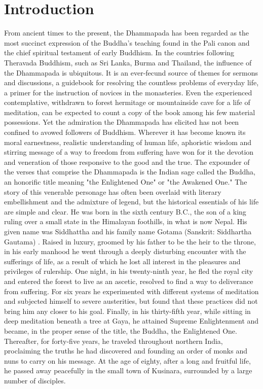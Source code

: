 \newpage
\chapter{Introduction}
	From ancient times to the present, the Dhammapada has been regarded as the most succinct expression of the Buddha's teaching found in the Pali canon and the chief spiritual testament of early Buddhism. In the countries following Theravada Buddhism, such as Sri Lanka, Burma and Thailand, the influence of the Dhammapada is ubiquitous. It is an ever-fecund source of themes for sermons and discussions, a guidebook for resolving the countless problems of everyday life, a primer for the instruction of novices in the monasteries. Even the experienced contemplative, withdrawn to forest hermitage or mountainside cave for a life of meditation, can be expected to count a copy of the book among his few material possessions. Yet the admiration the Dhammapada has elicited has not been confined to avowed followers of Buddhism. Wherever it has become known its moral earnestness, realistic understanding of human life, aphoristic wisdom and stirring message of a way to freedom from suffering have won for it the devotion and veneration of those responsive to the good and the true.
	The expounder of the verses that comprise the Dhammapada is the Indian sage called the Buddha, an honorific title meaning "the Enlightened One" or "the Awakened One." The story of this venerable personage has often been overlaid with literary embellishment and the admixture of legend, but the historical essentials of his life are simple and clear. He was born in the sixth century B.C., the son of a king ruling over a small state in the Himalayan foothills, in what is now Nepal. His given name was Siddhattha and his family name Gotama (Sanskrit: Siddhartha Gautama) . Raised in luxury, groomed by his father to be the heir to the throne, in his early manhood he went through a deeply disturbing encounter with the sufferings of life, as a result of which he lost all interest in the pleasures and privileges of rulership. One night, in his twenty-ninth year, he fled the royal city and entered the forest to live as an ascetic, resolved to find a way to deliverance from suffering. For six years he experimented with different systems of meditation and subjected himself to severe austerities, but found that these practices did not bring him any closer to his goal. Finally, in his thirty-fifth year, while sitting in deep meditation beneath a tree at Gaya, he attained Supreme Enlightenment and became, in the proper sense of the title, the Buddha, the Enlightened One. Thereafter, for forty-five years, he traveled throughout northern India, proclaiming the truths he had discovered and founding an order of monks and nuns to carry on his message. At the age of eighty, after a long and fruitful life, he passed away peacefully in the small town of Kusinara, surrounded by a large number of disciples.
